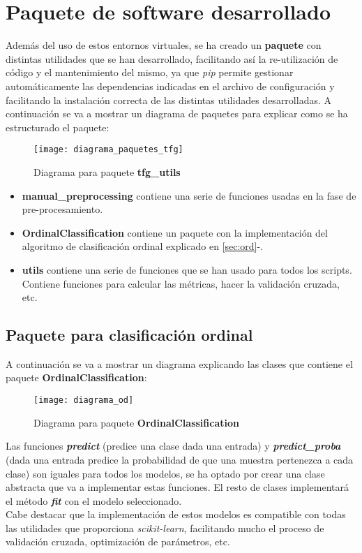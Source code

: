 \section{Paquete de software desarrollado}
Además del uso de estos entornos virtuales, se ha creado un \textbf{paquete} con distintas utilidades que se han desarrollado, facilitando así la re-utilización de código y el mantenimiento del mismo, ya que \textit{pip} permite gestionar automáticamente las dependencias indicadas en el archivo de configuración y facilitando la instalación correcta de las distintas utilidades desarrolladas.
A continuación se va a mostrar un diagrama de paquetes para explicar como se ha estructurado el paquete:
\begin{figure}[H]
    \centering
    \texttt{[image: diagrama\_paquetes\_tfg]}
    \caption{Diagrama para paquete \textbf{tfg\_utils}}
    \label{dig:paquetes_tfg}
\end{figure}
\begin{itemize}
    \item \textbf{manual\_preprocessing} contiene una serie de funciones usadas en la fase de pre-procesamiento.
    \item \textbf{OrdinalClassification} contiene un paquete con la implementación del algoritmo de clasificación ordinal explicado en \ref{sec:ord}-.
    \item \textbf{utils} contiene una serie de funciones que se han usado para todos los scripts. Contiene funciones para calcular las métricas, hacer la validación cruzada, etc.
\end{itemize}
\subsection{Paquete para clasificación ordinal}
A continuación se va a mostrar un diagrama explicando las clases que contiene el paquete \textbf{OrdinalClassification}:
\begin{figure}[H]
    \centering
    \texttt{[image: diagrama\_od]}
    \caption{Diagrama para paquete \textbf{OrdinalClassification}}
    \label{dig:paquetes_od}
\end{figure}
Las funciones \textbf{\textit{predict}} (predice una clase dada una entrada) y \textbf{\textit{predict\_proba}} (dada una entrada predice la probabilidad de que una muestra pertenezca a cada clase)  son iguales para todos los modelos, se ha optado por crear una clase abstracta que va a implementar estas funciones. El resto de clases implementará el método \textbf{\textit{fit}} con el modelo seleccionado. \\
Cabe destacar que la implementación de estos modelos es compatible con todas las utilidades que proporciona \textit{scikit-learn}, facilitando mucho el proceso de validación cruzada, optimización de parámetros, etc.\\
